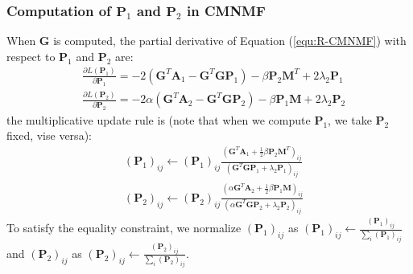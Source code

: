 \documentclass{bmcart}
\begin{document}
\subsubsection*{\textbf{Computation of $\bm{P}_1$ and $\bm{P}_2$ in CMNMF}}
When $\bm{G}$ is computed,
the partial derivative of Equation (\ref{equ:R-CMNMF}) with respect to $\bm{P}_1$ and $\bm{P}_2$ are:
\begin{equation}\label{equ:P1_gradient}\nonumber
\begin{split}
&\frac{\partial{L(\bm{P}_1)}}{\partial{\bm{P}_1}}=
-2(\bm{G}^T\bm{A}_1-{\bm{G}^T\bm{GP}_1})-\beta \bm{P}_2\bm{M}^T +2\lambda_2\bm{P}_1\\
&\frac{\partial{L(\bm{P}_2)}}{\partial{\bm{P}_2}}=
-2\alpha(\bm{G}^T\bm{A}_2-{\bm{G}^T\bm{GP}_2})-\beta \bm{P}_1\bm{M} +2\lambda_2\bm{P}_2
\end{split}
\end{equation}
the multiplicative update rule is (note that when we compute $\bm{P}_1$, we take $\bm{P}_2$ fixed, vise versa):
\begin{equation}\label{updating_P}\nonumber
\begin{split}
&(\bm{P}_1)_{ij}\leftarrow (\bm{P}_1)_{ij}
\frac{(\bm{G}^T\bm{A}_1+\frac{1}{2}\beta \bm{P}_2\bm{M}^T)_{ij}}
{(\bm{G}^T\bm{GP}_1+\lambda_2\bm{P}_1)_{ij}}\\
&(\bm{P}_2)_{ij}\leftarrow (\bm{P}_2)_{ij}
\frac{(\alpha \bm{G}^T\bm{A}_2+\frac{1}{2}\beta \bm{P}_1\bm{M})_{ij}}
{(\alpha \bm{G}^T\bm{GP}_2 + \lambda_2\bm{P}_2)_{ij}}
\end{split}
\end{equation}
To satisfy the equality constraint, we normalize $(\bm{P}_1)_{ij}$ as $(\bm{P}_1)_{ij}\leftarrow \frac{(\bm{P}_1)_{ij}}{\sum_{i}(\bm{P}_1)_{ij}}
$ and $(\bm{P}_2)_{ij}$ as $(\bm{P}_2)_{ij}\leftarrow \frac{(\bm{P}_2)_{ij}}{\sum_{i}(\bm{P}_2)_{ij}}$.
\end{document}
